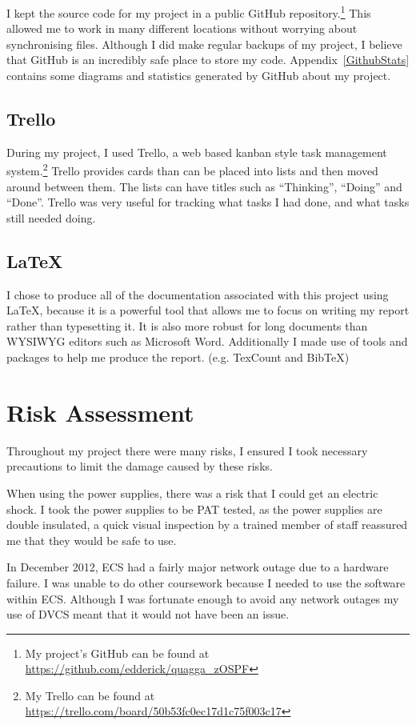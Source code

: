 \documentclass[12pt,a4paper,twoside]{report}
\begin{document}
I kept the source code for my project in a public GitHub repository.\footnote{My
project's GitHub can be found at
\url{https://github.com/edderick/quagga\_zOSPF}} This allowed me to work in
many different locations without worrying about synchronising files. Although
I did make regular backups of my project, I believe that GitHub is an incredibly
safe place to store my code. Appendix~\ref{GithubStats} contains some
diagrams and statistics generated by GitHub about my project. 

\subsection{Trello}
During my project, I used Trello, a web based kanban style task
management system.\footnote{My Trello can be found at
\url{https://trello.com/board/50b53fc0ec17d1c75f003c17}}
Trello provides cards than can be placed into lists and then moved around
between them. The lists can have titles such as ``Thinking'', ``Doing'' and
``Done''. Trello was very useful for tracking what tasks I had done, and what
tasks still needed doing. 

\subsection{\LaTeX}
I chose to produce all of the documentation associated with this project using
\LaTeX, because it is a powerful tool that allows me to focus on writing my
report rather than typesetting it. It is also more robust for long documents
than WYSIWYG editors such as Microsoft Word. Additionally I made use of tools
and packages to help me produce the report. (e.g. TexCount and BibTeX)

\section{Risk Assessment}
Throughout my project there were many risks, I ensured I took necessary
precautions to limit the damage caused by these risks.

When using the power supplies, there was a risk that I could get an electric
shock. I took the power supplies to be PAT tested, as the power supplies are
double insulated, a quick visual inspection by a trained member of staff
reassured me that they would be safe to use.

In December 2012, ECS had a fairly major network outage due to a hardware
failure. I was unable to do other coursework because I needed to use the
software within ECS\@. Although I was fortunate enough to avoid any network
outages my use of DVCS meant that it would not have been an issue.
\end{document}
